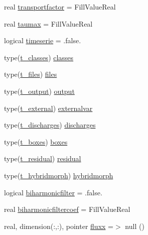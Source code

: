 \begin{DoxyCompactItemize}
\item 
real \mbox{\hyperlink{structmodulesand_1_1t__sand_a1e5e76aa5cb415c99d8f5fca71a4c72b}{transportfactor}} = Fill\+Value\+Real
\item 
real \mbox{\hyperlink{structmodulesand_1_1t__sand_ae9f30ddf3a417a60493d4b5b748578dd}{taumax}} = Fill\+Value\+Real
\item 
logical \mbox{\hyperlink{structmodulesand_1_1t__sand_a806fb1d1107b2eaac3b3ebed2ccae7c0}{timeserie}} = .false.
\item 
type(\mbox{\hyperlink{structmodulesand_1_1t__classes}{t\+\_\+classes}}) \mbox{\hyperlink{structmodulesand_1_1t__sand_a630216fe9fc9c1232fc9e957425a388a}{classes}}
\item 
type(\mbox{\hyperlink{structmodulesand_1_1t__files}{t\+\_\+files}}) \mbox{\hyperlink{structmodulesand_1_1t__sand_a1c00c7f741646f88b146d81e9d1a3eb9}{files}}
\item 
type(\mbox{\hyperlink{structmodulesand_1_1t__output}{t\+\_\+output}}) \mbox{\hyperlink{structmodulesand_1_1t__sand_a8e035dc91d24ebb849d3298a80a1f7ec}{output}}
\item 
type(\mbox{\hyperlink{structmodulesand_1_1t__external}{t\+\_\+external}}) \mbox{\hyperlink{structmodulesand_1_1t__sand_ad80da6fde5b2f9d44cea9097bb490903}{externalvar}}
\item 
type(\mbox{\hyperlink{structmodulesand_1_1t__discharges}{t\+\_\+discharges}}) \mbox{\hyperlink{structmodulesand_1_1t__sand_a49179a0853c2bdd1228fe230a268aff1}{discharges}}
\item 
type(\mbox{\hyperlink{structmodulesand_1_1t__boxes}{t\+\_\+boxes}}) \mbox{\hyperlink{structmodulesand_1_1t__sand_a99d6516f2baf3e2c064c58d1ae9ceeb9}{boxes}}
\item 
type(\mbox{\hyperlink{structmodulesand_1_1t__residual}{t\+\_\+residual}}) \mbox{\hyperlink{structmodulesand_1_1t__sand_aa73687d85734b30c57163e3a63fa0659}{residual}}
\item 
type(\mbox{\hyperlink{structmodulesand_1_1t__hybridmorph}{t\+\_\+hybridmorph}}) \mbox{\hyperlink{structmodulesand_1_1t__sand_a4744b11a84b15e62e330d6bbc5531b07}{hybridmorph}}
\item 
logical \mbox{\hyperlink{structmodulesand_1_1t__sand_a5079bc00c0bdcf506d74cf4e7ee6831e}{biharmonicfilter}} = .false.
\item 
real \mbox{\hyperlink{structmodulesand_1_1t__sand_ad04b9e37a18bf62f9c0d1b8d9abfdff2}{biharmonicfiltercoef}} = Fill\+Value\+Real
\item 
real, dimension(\+:,\+:), pointer \mbox{\hyperlink{structmodulesand_1_1t__sand_a470c0bd1963c88bf3d6265c01a59b9f9}{fluxx}} =$>$ null ()

\end{DoxyCompactItemize}
